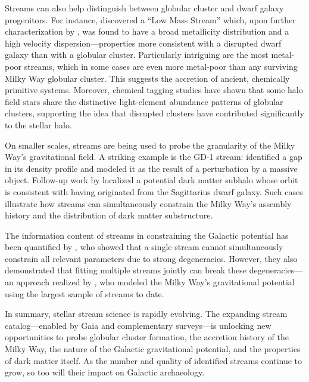     Streams can also help distinguish between globular cluster and dwarf galaxy progenitors. For instance, \citet{2020ApJ...898L..37Y} discovered a ``Low Mass Stream'' which, upon further characterization by \citet{2021ApJ...920...51M}, was found to have a broad metallicity distribution and a high velocity dispersion—properties more consistent with a disrupted dwarf galaxy than with a globular cluster. Particularly intriguing are the most metal-poor streams, which in some cases are even more metal-poor than any surviving Milky Way globular cluster. This suggests the accretion of ancient, chemically primitive systems. Moreover, chemical tagging studies have shown that some halo field stars share the distinctive light-element abundance patterns of globular clusters, supporting the idea that disrupted clusters have contributed significantly to the stellar halo.

    On smaller scales, streams are being used to probe the granularity of the Milky Way's gravitational field. A striking example is the GD-1 stream: \citet{2019ApJ...880...38B} identified a gap in its density profile and modeled it as the result of a perturbation by a massive object. Follow-up work by \citet{2020ApJ...892L..37B} localized a potential dark matter subhalo whose orbit is consistent with having originated from the Sagittarius dwarf galaxy. Such cases illustrate how streams can simultaneously constrain the Milky Way's assembly history and the distribution of dark matter substructure.

    The information content of streams in constraining the Galactic potential has been quantified by \citet{2018ApJ...867..101B}, who showed that a single stream cannot simultaneously constrain all relevant parameters due to strong degeneracies. However, they also demonstrated that fitting multiple streams jointly can break these degeneracies—an approach realized by \citet{2024ApJ...967...89I}, who modeled the Milky Way's gravitational potential using the largest sample of streams to date.

    In summary, stellar stream science is rapidly evolving. The expanding stream catalog—enabled by Gaia and complementary surveys—is unlocking new opportunities to probe globular cluster formation, the accretion history of the Milky Way, the nature of the Galactic gravitational potential, and the properties of dark matter itself. As the number and quality of identified streams continue to grow, so too will their impact on Galactic archaeology.
